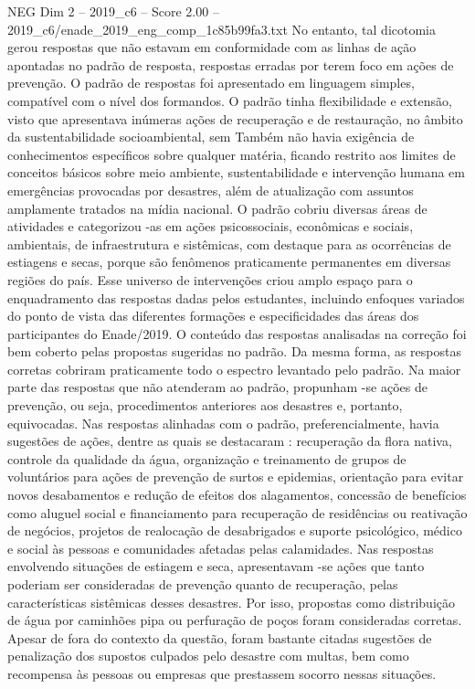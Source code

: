 \begin{textsample}{NEG Dim 2 – 2019\_c6 – Score 2.00 – 2019\_c6/enade\_2019\_eng\_comp\_1c85b99fa3.txt}
No entanto, tal dicotomia gerou respostas que não estavam em conformidade com as linhas de ação apontadas no padrão de resposta, respostas erradas por terem foco em ações de prevenção.
O padrão de respostas foi apresentado em linguagem simples, compatível com o nível dos formandos.
O padrão tinha flexibilidade e extensão, visto que apresentava inúmeras ações de recuperação e de restauração, no âmbito da sustentabilidade socioambiental, sem Também não havia exigência de conhecimentos específicos sobre qualquer matéria, ficando restrito aos limites de conceitos básicos sobre meio ambiente, sustentabilidade e intervenção humana em emergências provocadas por desastres, além de atualização com assuntos amplamente tratados na mídia nacional.
O padrão cobriu diversas áreas de atividades e categorizou -as em ações psicossociais, econômicas e sociais, ambientais, de infraestrutura e sistêmicas, com destaque para as ocorrências de estiagens e secas, porque são fenômenos praticamente permanentes em diversas regiões do país.
Esse universo de intervenções criou amplo espaço para o enquadramento das respostas dadas pelos estudantes, incluindo enfoques variados do ponto de vista das diferentes formações e especificidades das áreas dos participantes do Enade/2019.
O conteúdo das respostas analisadas na correção foi bem coberto pelas propostas sugeridas no padrão.
Da mesma forma, as respostas corretas cobriram praticamente todo o espectro levantado pelo padrão.
Na maior parte das respostas que não atenderam ao padrão, propunham -se ações de prevenção, ou seja, procedimentos anteriores aos desastres e, portanto, equivocadas.
Nas respostas alinhadas com o padrão, preferencialmente, havia sugestões de ações, dentre as quais se destacaram : recuperação da flora nativa, controle da qualidade da água, organização e treinamento de grupos de voluntários para ações de prevenção de surtos e epidemias, orientação para evitar novos desabamentos e redução de efeitos dos alagamentos, concessão de benefícios como aluguel social e financiamento para recuperação de residências ou reativação de negócios, projetos de realocação de desabrigados e suporte psicológico, médico e social às pessoas e comunidades afetadas pelas calamidades.
Nas respostas envolvendo situações de estiagem e seca, apresentavam -se ações que tanto poderiam ser consideradas de prevenção quanto de recuperação, pelas características sistêmicas desses desastres.
Por isso, propostas como distribuição de água por caminhões pipa ou perfuração de poços foram consideradas corretas.
Apesar de fora do contexto da questão, foram bastante citadas sugestões de penalização dos supostos culpados pelo desastre com multas, bem como recompensa às pessoas ou empresas que prestassem socorro nessas situações.

\end{textsample}
